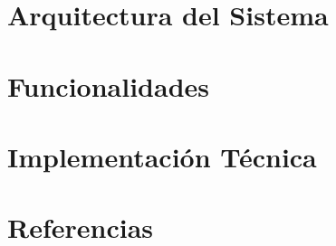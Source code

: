 \documentclass[12pt]{article}
\begin{document}
\section{Arquitectura del Sistema}

\section{Funcionalidades}

\section{Implementación Técnica}


\section{Referencias}
\end{document}
